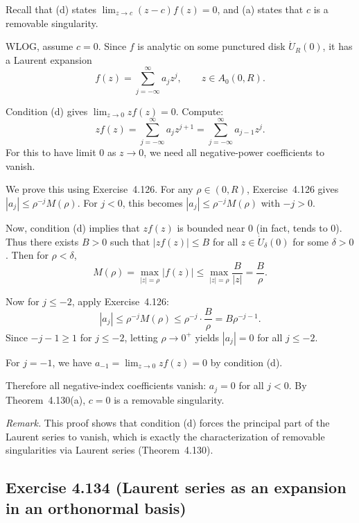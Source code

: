 \documentclass{article}
\begin{document}
\begin{solution}
  Recall that (d) states $\lim_{z \to c} (z-c)f(z) = 0$, and (a) states that
  $c$ is a removable singularity.

  WLOG, assume $c = 0$. Since $f$ is analytic on some punctured disk
  $\dot{U}_R(0)$, it has a Laurent expansion
  \[
    f(z) = \sum_{j=-\infty}^{\infty} a_j z^j, \qquad z \in A_0(0, R).
  \]

  Condition (d) gives $\lim_{z \to 0} z f(z) = 0$. Compute:
  \[
    z f(z) = \sum_{j=-\infty}^{\infty} a_j z^{j+1}
    = \sum_{j=-\infty}^{\infty} a_{j-1} z^j.
  \]
  For this to have limit $0$ as $z \to 0$, we need all negative-power
  coefficients to vanish.

  We prove this using Exercise~4.126. For any $\rho \in (0, R)$,
  Exercise~4.126 gives $|a_j| \le \rho^{-j} M(\rho)$.
  For $j < 0$, this becomes $|a_j| \le \rho^{-j} M(\rho)$ with $-j > 0$.

  Now, condition (d) implies that $z f(z)$ is bounded near $0$ (in fact,
  tends to $0$). Thus there exists $B > 0$ such that
  $|z f(z)| \le B$ for all $z \in \dot{U}_{\delta}(0)$ for some $\delta > 0$.
  Then for $\rho < \delta$,
  \[
    M(\rho) = \max_{|z|=\rho} |f(z)|
    \le \max_{|z|=\rho} \frac{B}{|z|} = \frac{B}{\rho}.
  \]

  Now for $j \le -2$, apply Exercise~4.126:
  \[
    |a_j| \le \rho^{-j} M(\rho) \le \rho^{-j} \cdot \frac{B}{\rho}
    = B \rho^{-j-1}.
  \]
  Since $-j-1 \ge 1$ for $j \le -2$, letting $\rho \to 0^+$ yields
  $|a_j| = 0$ for all $j \le -2$.

  For $j = -1$, we have $a_{-1} = \lim_{z \to 0} z f(z) = 0$ by condition (d).

  Therefore all negative-index coefficients vanish: $a_j = 0$ for all
  $j < 0$. By Theorem~4.130(a), $c = 0$ is a removable singularity.

  \medskip
  \noindent\textit{Remark.} This proof shows that condition (d) forces the
  principal part of the Laurent series to vanish, which is exactly the
  characterization of removable singularities via Laurent series
  (Theorem~4.130).
\end{solution}

\subsection{Exercise 4.134 (Laurent series as an expansion in an orthonormal basis)}
\end{document}
